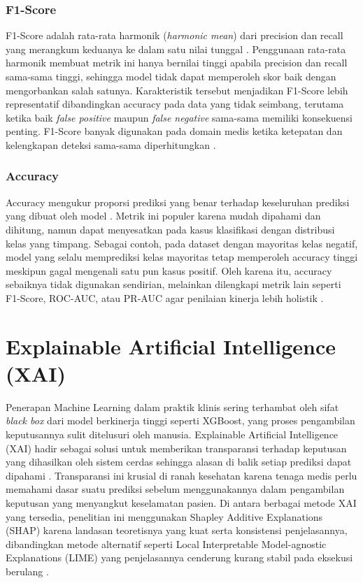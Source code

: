 \subsubsection{F1-Score}
F1-Score adalah rata-rata harmonik (\emph{harmonic mean}) dari precision dan recall yang merangkum keduanya ke dalam satu nilai tunggal \autocite{Sokolova2009Systematic}. Penggunaan rata-rata harmonik membuat metrik ini hanya bernilai tinggi apabila precision dan recall sama-sama tinggi, sehingga model tidak dapat memperoleh skor baik dengan mengorbankan salah satunya. Karakteristik tersebut menjadikan F1-Score lebih representatif dibandingkan accuracy pada data yang tidak seimbang, terutama ketika baik \emph{false positive} maupun \emph{false negative} sama-sama memiliki konsekuensi penting. F1-Score banyak digunakan pada domain medis ketika ketepatan dan kelengkapan deteksi sama-sama diperhitungkan \autocite{Sokolova2009Systematic}.

\subsubsection{Accuracy}
Accuracy mengukur proporsi prediksi yang benar terhadap keseluruhan prediksi yang dibuat oleh model \autocite{Sokolova2009Systematic}. Metrik ini populer karena mudah dipahami dan dihitung, namun dapat menyesatkan pada kasus klasifikasi dengan distribusi kelas yang timpang. Sebagai contoh, pada dataset dengan mayoritas kelas negatif, model yang selalu memprediksi kelas mayoritas tetap memperoleh accuracy tinggi meskipun gagal mengenali satu pun kasus positif. Oleh karena itu, accuracy sebaiknya tidak digunakan sendirian, melainkan dilengkapi metrik lain seperti F1-Score, ROC-AUC, atau PR-AUC agar penilaian kinerja lebih holistik \autocite{Sokolova2009Systematic}.

\section{Explainable Artificial Intelligence (XAI)}
Penerapan Machine Learning dalam praktik klinis sering terhambat oleh sifat \textit{black box} dari model berkinerja tinggi seperti XGBoost, yang proses pengambilan keputusannya sulit ditelusuri oleh manusia. Explainable Artificial Intelligence (XAI) hadir sebagai solusi untuk memberikan transparansi terhadap keputusan yang dihasilkan oleh sistem cerdas sehingga alasan di balik setiap prediksi dapat dipahami \autocite{Adadi2018}. Transparansi ini krusial di ranah kesehatan karena tenaga medis perlu memahami dasar suatu prediksi sebelum menggunakannya dalam pengambilan keputusan yang menyangkut keselamatan pasien. Di antara berbagai metode XAI yang tersedia, penelitian ini menggunakan Shapley Additive Explanations (SHAP) karena landasan teoretisnya yang kuat serta konsistensi penjelasannya, dibandingkan metode alternatif seperti Local Interpretable Model-agnostic Explanations (LIME) yang penjelasannya cenderung kurang stabil pada eksekusi berulang \autocite{molnar2025interpretable}.

